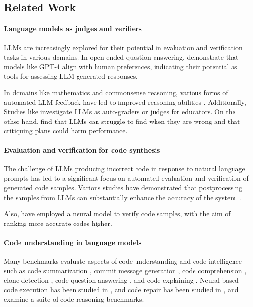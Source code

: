 \subsection{Related Work}
\paragraph{Language models as judges and verifiers}
LLMs are increasingly explored for their potential in evaluation and verification tasks in various domains. In open-ended question answering, \citet{zheng2023judging} demonstrate that models like GPT-4 align with human preferences, indicating their potential as tools for assessing LLM-generated responses. 

In domains like mathematics and commonsense reasoning, various forms of automated LLM feedback have led to improved reasoning abilities \citep{cobbe2021training, zhou2023solving, weng2022large, lightman2023let, chen2023universal,wang2023math,shao2024deepseekmath}. 
Additionally, Studies like \citep{schneider2023towards, matelsky2023large} investigate LLMs as auto-graders or judges for educators.
On the other hand, \citet{valmeekam2023can, tyen2023llms, stechly2023gpt, chen2024tree} find that LLMs can struggle to find when they are wrong and that critiquing plans could harm performance.

\paragraph{Evaluation and verification for code synthesis}
The challenge of LLMs producing incorrect code in response to natural language prompts has led to a significant focus on automated evaluation and verification of generated code samples. Various studies have demonstrated that postprocessing the samples from LLMs can substantially enhance the accuracy of the system~\citep{chen2022codet, ridnik2024code, key2022speak, zhang2023algo, li2022competition, huang2023enhancing}.

Also, \citet{inala2022fault,zhang2023coder,ni2023lever} have employed a neural model to verify code samples, with the aim of ranking more accurate codes higher.

\paragraph{Code understanding in language models}
Many benchmarks evaluate aspects of code understanding and code intelligence such as code summarization \citep{iyer2016summarizing, hasan2021codesc}, commit message generation \citep{liu2020atom}, code comprehension \citep{singhal2024nofuneval}, clone detection \citep{lu2021codexglue}, code question answering \citep{sahu2022learning}, and code explaining \citep{muennighoff2023octopack}. Neural-based code execution has been studied in \citep{austin2021program, nye2021show, gu2024cruxeval, la2024code}, and code repair has been studied in \citep{madaan2023self, chen2024teaching, zhang2023self, olausson2024repair}, and \citet{liu2024codemind} examine a suite of code reasoning benchmarks.

